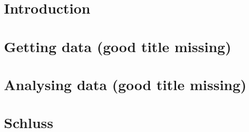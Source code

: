 \chapter{Introduction}
	
	
\chapter{Getting data (good title missing)}

	
	
	
		
\chapter{Analysing data (good title missing)}

	
					
		
\chapter{Schluss}

	
		
		
%	

% 		

